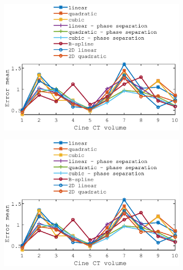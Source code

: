 \documentclass[11pt,a4paper,oneside]{report}
\begin{document}
\newcommand{\trimval}{140}
\newcommand{\trimvalleg}{140}

\begin{figure}
  \centering
  \begin{subfigure}[b]{0.33\textwidth}
    \includegraphics[width=\textwidth, trim=80 243 80 0,clip=true]{figures/task4/def_mean_error_couch1.eps}
  \end{subfigure}%
  \hspace{-3em}
  \begin{subfigure}[b]{0.33\textwidth}
    \includegraphics[width=\textwidth, trim=80 203 80 55,clip=true]{figures/task4/def_mean_error_couch1.eps}
  \end{subfigure}%
  \hspace{2em}
  \begin{subfigure}[b]{0.33\textwidth}

\end{subfigure}
\end{figure}
\end{document}
